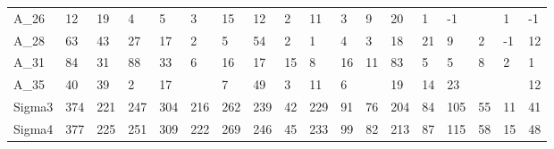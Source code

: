 \begin{tabular}{llllllllllllllllll}
A\_26   &      12 &    19 &     4 &         5 &    3 &    15 &         12 &     2 &             11 &          3 &       9 &         20 &          1 &     -1 &       &    1 &    -1 \\
A\_28   &      63 &    43 &    27 &        17 &    2 &     5 &         54 &     2 &              1 &          4 &       3 &         18 &         21 &      9 &     2 &   -1 &    12 \\
A\_31   &      84 &    31 &    88 &        33 &    6 &    16 &         17 &    15 &              8 &         16 &      11 &         83 &          5 &      5 &     8 &    2 &     1 \\
A\_35   &      40 &    39 &     2 &        17 &      &     7 &         49 &     3 &             11 &          6 &         &         19 &         14 &     23 &       &      &    12 \\
Sigma3 &     374 &   221 &   247 &       304 &  216 &   262 &        239 &    42 &            229 &         91 &      76 &        204 &         84 &    105 &    55 &   11 &    41 \\
Sigma4 &     377 &   225 &   251 &       309 &  222 &   269 &        246 &    45 &            233 &         99 &      82 &        213 &         87 &    115 &    58 &   15 &    48 \\
\bottomrule
\end{tabular}
